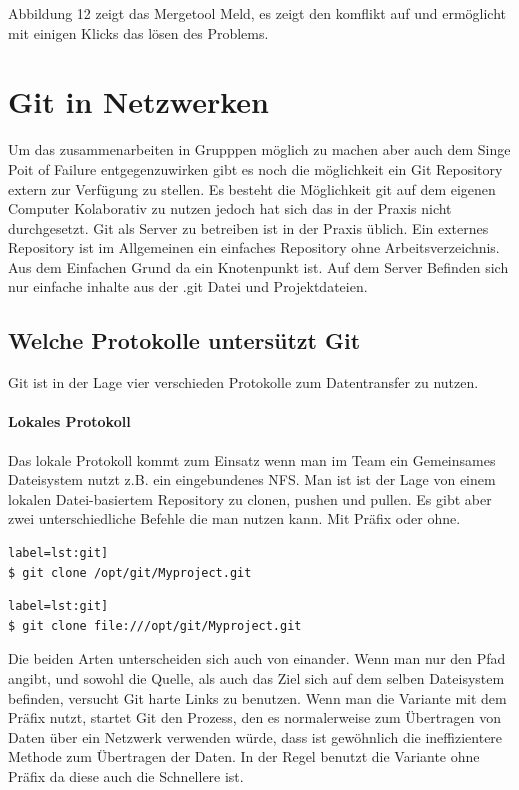 \documentclass[12pt,a4paper,bibliography=totocnumbered,listof=totocnumbered]{scrartcl}
\begin{document}
Abbildung 12 zeigt das Mergetool Meld, es zeigt den komflikt auf und ermöglicht mit einigen Klicks das lösen des Problems.

\section{Git in Netzwerken}
Um das zusammenarbeiten in Grupppen möglich zu machen aber auch dem Singe Poit of Failure  entgegenzuwirken gibt es noch die möglichkeit  ein Git Repository extern zur Verfügung zu stellen. Es besteht die Möglichkeit git auf dem eigenen Computer Kolaborativ zu nutzen jedoch hat sich das in der Praxis nicht durchgesetzt. Git als Server zu betreiben ist in der Praxis üblich. Ein externes Repository  ist im Allgemeinen ein einfaches Repository ohne Arbeitsverzeichnis. 
Aus dem Einfachen Grund da ein Knotenpunkt ist. Auf dem Server Befinden sich nur einfache inhalte aus der .git Datei und Projektdateien.

\subsection{Welche Protokolle untersützt Git}
Git ist in der Lage vier verschieden Protokolle zum Datentransfer zu nutzen.
\paragraph{Lokales Protokoll}
Das lokale Protokoll kommt zum Einsatz wenn man im Team ein Gemeinsames Dateisystem nutzt z.B. ein eingebundenes NFS. Man ist ist der Lage  von einem lokalen Datei-basiertem Repository zu clonen, pushen und pullen. 
Es gibt aber zwei unterschiedliche Befehle die man nutzen kann. Mit Präfix oder ohne.
\begin{lstlisting}[caption=Ohne Präfix] label=lst:git]
$ git clone /opt/git/Myproject.git
\end{lstlisting}

\begin{lstlisting}[caption=Mit Präfix] label=lst:git]
$ git clone file:///opt/git/Myproject.git
\end{lstlisting}
Die beiden Arten unterscheiden sich auch von einander.
Wenn man nur den Pfad angibt, und sowohl die Quelle, als auch das Ziel sich auf dem selben Dateisystem befinden, versucht Git harte Links zu benutzen. Wenn man die Variante mit dem Präfix nutzt, startet Git den Prozess, den es normalerweise zum Übertragen von Daten über ein Netzwerk verwenden würde, dass ist gewöhnlich die ineffizientere Methode zum Übertragen der Daten. In der Regel benutzt die Variante ohne Präfix da diese auch die Schnellere ist.	
\end{document}
